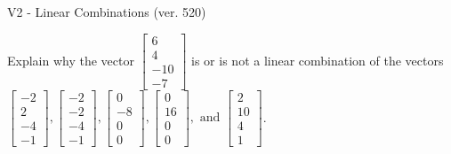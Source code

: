 \begin{exercise}
  \begin{exerciseTitle}V2 - Linear Combinations (ver. 520)\end{exerciseTitle}
  \begin{exerciseStatement}
    Explain why the vector \(\left[\begin{array}{c}
6 \\
4 \\
-10 \\
-7
\end{array}\right]\)  is or is not a linear 
	combination of the vectors \(\left[\begin{array}{c}
-2 \\
2 \\
-4 \\
-1
\end{array}\right] , \left[\begin{array}{c}
-2 \\
-2 \\
-4 \\
-1
\end{array}\right] , \left[\begin{array}{c}
0 \\
-8 \\
0 \\
0
\end{array}\right] , \left[\begin{array}{c}
0 \\
16 \\
0 \\
0
\end{array}\right] , \text{ and } \left[\begin{array}{c}
2 \\
10 \\
4 \\
1
\end{array}\right]\).
	



\end{exerciseStatement}
\end{exercise}
